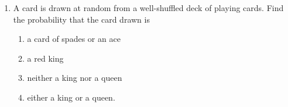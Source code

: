 \begin{enumerate}

\item A card is drawn at random from a well-shuffled deck of playing cards. Find the probability that the card drawn is

 \begin{enumerate}
        \item a card of spades or an ace
        \item a red king
        \item neither a king nor a queen
        \item either a king or a queen.
 \end{enumerate}

\end{enumerate}

